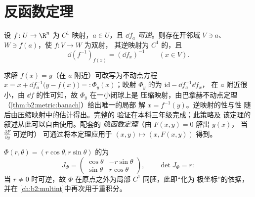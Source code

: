 \section{反函数定理}

\begin{theorem}[反函数定理]\label{thm:b2:diffcalc:inverse}
设 $f \colon U \to \R^n$ 为 $C^1$ 映射，$a \in U$，且 $\dd f_a$
\emph{可逆}。则存在开邻域 $V \ni a$、$W
\ni f(a)$，使 $f \colon V \to W$ 为双射，
其逆映射为 $C^1$ 的，且
\[
\dd (f^{-1})_{f(x)} = (\dd f_x)^{-1} \qquad (x \in V).
\]
\end{theorem}
\admitted

\begin{remark}
求解 $f(x) = y$（在 $a$ 附近）可改写为不动点方程
$x = x + \dd f_a^{-1}\bigl(y - f(x)\bigr) =: \Phi_y(x)$；映射
$\Phi_y$ 的为 $\mathrm{id} - \dd f_a^{-1}\dd f_x$，
在 $a$ 附近很小，由 $\dd f$ 的性可知，故 $\Phi_y$ 在一小闭球上是
压缩映射，由巴拿赫不动点定理
（\cref{thm:b2:metric:banach}）给出唯一的局部
解 $x = f^{-1}(y)$。逆映射的性与性
随后由压缩映射中的估计得出。完整的
验证在本科三年级完成；此策略及
该定理的叙述从此可以自由使用。配套的
\emph{隐函数定理}（由 $F(x, y) = 0$ 解出 $y(x)$，
当 $\frac{\partial F}{\partial y}$ 可逆时）
可通过将本定理应用于 $(x, y) \mapsto (x, F(x,y))$ 得到。
\end{remark}

\begin{example}[极坐标]\label{ex:b2:diffcalc:polar}
$\Phi(r, \theta) = (r\cos\theta, r\sin\theta)$ 的为
\[
J_\Phi = \begin{pmatrix} \cos\theta & -r\sin\theta\\ \sin\theta &
r\cos\theta \end{pmatrix},
\qquad \det J_\Phi = r :
\]
当 $r \neq 0$ 时可逆，故 $\Phi$ 在原点之外为局部 $C^1$
同胚，此即“化为
极坐标”的依据，并在
\cref{ch:b2:multint}中再次用于重积分。
\end{example}

